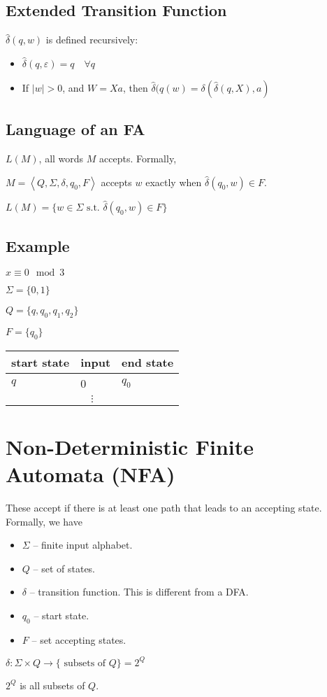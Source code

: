 \documentclass[12pt]{article}
\begin{document}
\subsection{Extended Transition Function}

$\hat{\delta}(q,w)$ is defined recursively:
\begin{itemize}
    \item $\hat{\delta}(q,\varepsilon) = q \quad \forall q$
    \item If $|w|>0$, and $W = Xa$, then $\hat{\delta}(q(w) =
        \delta\left(\hat{\delta}(q,X),a\right)$
\end{itemize}

\subsection{Language of an FA}

$L(M)$, all words $M$ accepts. Formally,

$M = \left<Q,\Sigma,\delta,q_0,F\right>$ accepts $w$ exactly when
$\hat{\delta}(q_0,w)\in F$.

$L(M) = \{ w \in \Sigma \text{ s.t. } \hat{\delta}(q_0,w)\in F\}$

\subsection{Example}

$x \equiv 0 \mod 3$

$\Sigma = \{0,1\}$

$Q = \{ q, q_0, q_1, q_2 \}$

$F = \{q_0\}$


\begin{tabular}{l|l|l}
    start state & input & end state \\
    \hline
    $q$         & 0     & $q_0$     \\
    \multicolumn{3}{c}{$\vdots$}
\end{tabular}

\section{Non-Deterministic Finite Automata (NFA)}

These accept if there is at least one path that leads to an accepting state.
Formally, we have
\begin{itemize}
    \item $\Sigma$ -- finite input alphabet.
    \item $Q$ -- set of states.
    \item $\delta$ -- transition function. This is different from a DFA.
    \item $q_0$ -- start state.
    \item $F$ -- set accepting states.
\end{itemize}

$\delta: \Sigma \times Q \to \{ \text{ subsets of $Q$}\} = 2^Q$

$2^Q$ is all subsets of $Q$.
\end{document}
